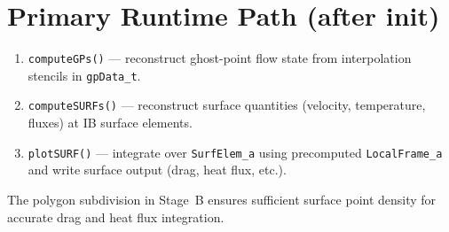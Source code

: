 \documentclass[11pt,a4paper]{article}
\begin{document}
\section{Primary Runtime Path (after init)}

\begin{enumerate}[nosep]
  \item \texttt{computeGPs()} --- reconstruct ghost-point flow state from interpolation
        stencils in \texttt{gpData\_t}.
  \item \texttt{computeSURFs()} --- reconstruct surface quantities (velocity, temperature,
        fluxes) at IB surface elements.
  \item \texttt{plotSURF()} --- integrate over \texttt{SurfElem\_a} using precomputed
        \texttt{LocalFrame\_a} and write surface output (drag, heat flux, etc.).
\end{enumerate}

The polygon subdivision in Stage~B ensures sufficient surface point density for accurate
drag and heat flux integration.
\end{document}
